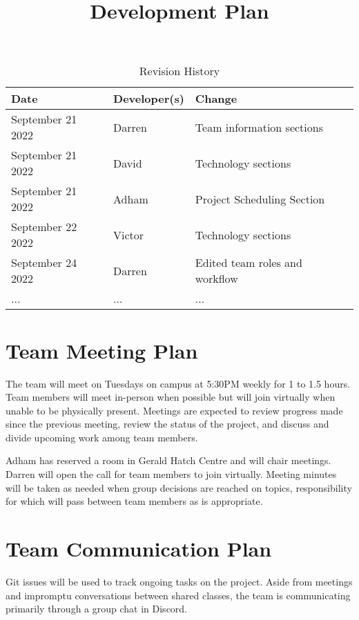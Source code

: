 \documentclass{article}
\title{Development Plan\\\progname}
\author{\authname}
\date{}
\begin{document}
\begin{table}[hp]
\caption{Revision History} \label{TblRevisionHistory}
\begin{tabularx}{\textwidth}{llX}
\toprule
\textbf{Date} & \textbf{Developer(s)} & \textbf{Change}\\
\midrule
September 21 2022 & Darren & Team information sections\\
September 21 2022 & David & Technology sections\\
September 21 2022 & Adham & Project Scheduling Section\\
September 22 2022 & Victor & Technology sections\\
September 24 2022 & Darren & Edited team roles and workflow\\
... & ... & ...\\
\bottomrule
\end{tabularx}
\end{table}

\newpage

\maketitle


\section{Team Meeting Plan}

The team will meet on Tuesdays on campus at 5:30PM weekly for 1 to 1.5 hours. Team members will meet in-person when possible but will join virtually when unable to be physically present. Meetings are expected to review progress made since the previous meeting, review the status of the project, and discuss and divide upcoming work among team members.

Adham has reserved a room in Gerald Hatch Centre and will chair meetings. Darren will open the call for team members to join virtually. Meeting minutes will be taken as needed when group decisions are reached on topics, responsibility for which will pass between team members as is appropriate.

\section{Team Communication Plan}

Git issues will be used to track ongoing tasks on the project. Aside from meetings and impromptu conversations between shared classes, the team is communicating primarily through a group chat in Discord.
\end{document}
